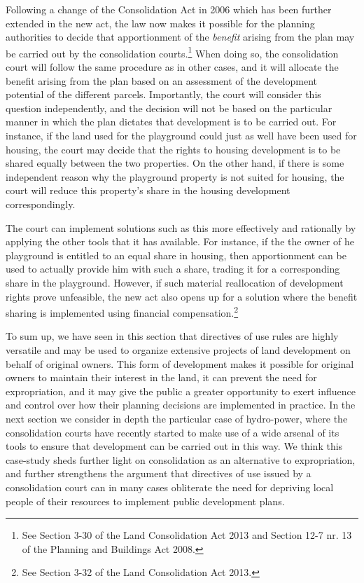\documentclass[10pt]{article} %
\begin{document}
Following a change of the Consolidation Act in 2006 which has been further extended in the new act, the law now makes it possible for the planning authorities to decide that apportionment of the \emph{benefit} arising from the plan may be carried out by the consolidation courts.\footnote{See Section 3-30 of the Land Consolidation Act 2013 and Section 12-7 nr. 13 of the Planning and Buildings Act 2008.} When doing so, the consolidation court will follow the same procedure as in other cases, and it will allocate the benefit arising from the plan based on an assessment of the development potential of the different parcels. Importantly, the court will consider this question independently, and the decision will not be based on the particular manner in which the plan dictates that development is to be carried out. For instance, if the land used for the playground could just as well have been used for housing, the court may decide that the rights to housing development is to be shared equally between the two properties. On the other hand, if there is some independent reason why the playground property is not suited for housing, the court will reduce this property's share in the housing development correspondingly.

The court can implement solutions such as this more effectively and rationally by applying the other tools that it has available. For instance, if the the owner of he playground is entitled to an equal share in housing, then apportionment can be used to actually provide him with such a share, trading it for a corresponding share in the playground. However, if such material reallocation of development rights prove unfeasible, the new act also opens up for a solution where the benefit sharing is implemented using financial compensation.\footnote{See Section 3-32 of the Land Consolidation Act 2013.}

To sum up, we have seen in this section that directives of use rules are highly versatile and may be used 
to organize extensive projects of land development on behalf of original owners. This form of development makes it possible for original owners to maintain their interest in the land, it can prevent the need for expropriation, and it may give the public a greater opportunity to exert influence and control over how their planning decisions are implemented in practice. In the next section we consider in depth the particular case of hydro-power, where the consolidation courts have recently started to make use of a wide arsenal of its tools to ensure that development can be carried out in this way. We think this case-study sheds further light on consolidation as an alternative to expropriation, and further strengthens the argument that directives of use issued by a consolidation court can in many cases obliterate the need for depriving local people of their resources to implement public development plans.
\end{document}
